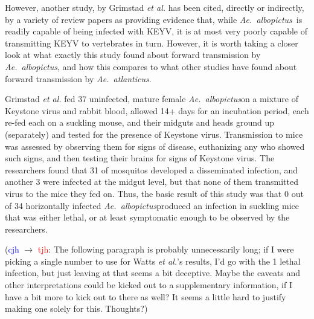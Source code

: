 \documentclass[12pt]{article}
\newcommand{\alb}{\textit{Ae.\ albopictus}}
\newcommand{\atl}{\textit{Ae.\ atlanticus}}
\newcommand{\cjh}{\textcolor{blue}{cjh}}
\newcommand{\tjh}{\textcolor{red}{tjh}}
\newcommand{\msg}[3]{(#1 $\rightarrow$ #2: #3)}
\newcommand{\mct}[1]{\msg\cjh\tjh{#1}}
\begin{document}
            However, another study, by Grimstad \textit{et al.} \cite{grimstad1989recently} has been cited, directly or indirectly, by a variety of review papers\cite{asdf,asdf} as providing evidence that, while \alb\ is readily capable of being infected with KEYV, it is at most very poorly capable of transmitting KEYV to vertebrates in turn. However, it is worth taking a closer look at what exactly this study found about forward transmission by \alb, and how this compares to what other studies have found about forward transmission by \atl.

        Grimstad \textit{et al.} fed 37 uninfected, mature female \alb on a mixture of Keystone virus and rabbit blood, allowed 14+ days for an incubation period, each re-fed each on a suckling mouse, and their midguts and heads ground up (separately) and tested for the presence of Keystone virus. Transmission to mice was assessed by observing them for signs of disease, euthanizing any who showed such signs, and then testing their brains for signs of Keystone virus. The researchers found that 31 of mosquitos developed a disseminated infection, and another 3 were infected at the midgut level, but that none of them transmitted virus to the mice they fed on. Thus, the basic result of this study was that 0 out of 34 horizontally infected \alb produced an infection in suckling mice that was either lethal, or at least symptomatic enough to be observed by the researchers.

        \mct{The following paragraph is probably unnecessarily long; if I were picking a single number to use for Watts \textit{et al.}'s results, I'd go with the 1 lethal infection, but just leaving at that seems a bit deceptive. Maybe the caveats and other interpretations could be kicked out to a supplementary information, if I have a bit more to kick out to there as well? It seems a little hard to justify making one solely for this. Thoughts?}
\end{document}
